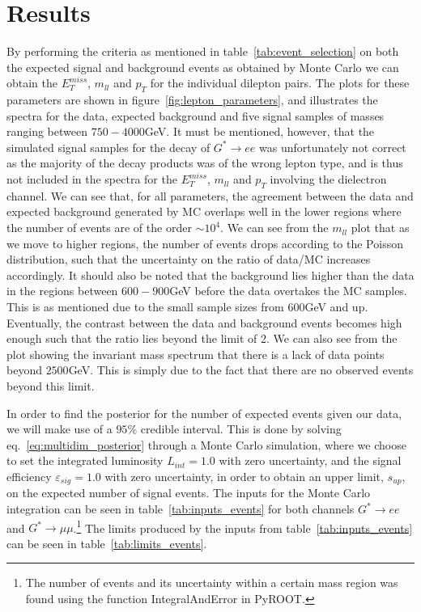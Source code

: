 \documentclass[12pt,a4paper]{amsart}
\begin{document}
\section{Results}
By performing the criteria as mentioned in table~\ref{tab:event_selection} on both the expected signal and background events as obtained by Monte Carlo we can obtain the $E_T^{miss}$, $m_{ll}$ and $p_T$ for the individual dilepton pairs. The plots for these parameters are shown in figure~\ref{fig:lepton_parameters}, and illustrates the spectra for the data, expected background and five signal samples of masses ranging between $750-4000$GeV. It must be mentioned, however, that the simulated signal samples for the decay of $G^*\rightarrow ee$ was unfortunately not correct as the majority of the decay products was of the wrong lepton type, and is thus not included in the spectra for the $E_T^{miss}$, $m_{ll}$ and $p_T$ involving the dielectron channel. We can see that, for all parameters, the agreement between the data and expected background generated by MC overlaps well in the lower regions where the number of events are of the order $\sim 10^4$. We can see from the $m_{ll}$ plot that as we move to higher regions, the number of events drops according to the Poisson distribution, such that the uncertainty on the ratio of data/MC increases accordingly. It should also be noted that the background lies higher than the data in the regions between $600-900$GeV before the data overtakes the MC samples. This is as mentioned due to the small sample sizes from $600$GeV and up.  Eventually, the contrast between the data and background events becomes high enough such that the ratio lies beyond the limit of 2. We can also see from the plot showing the invariant mass spectrum that there is a lack of data points beyond $2500$GeV. This is simply due to the fact that there are no observed events beyond this limit.

In order to find the posterior for the number of expected events given our data, we will make use of a $95\%$ credible interval. This is done by solving eq.~\eqref{eq:multidim_posterior} through a Monte Carlo simulation, where we choose to set the integrated luminosity $L_{int} = 1.0$ with zero uncertainty, and the signal efficiency $\varepsilon_{sig} = 1.0$ with zero uncertainty, in order to obtain an upper limit, $s_{up}$, on the expected number of signal events. The inputs for the Monte Carlo integration can be seen in table~\ref{tab:inputs_events} for both channels $G^{*}\rightarrow ee$ and $G^*\rightarrow \mu\mu$.\footnote{The number of events and its uncertainty within a certain mass region was found using the function IntegralAndError in PyROOT.} The limits produced by the inputs from table~\ref{tab:inputs_events} can be seen in table~\ref{tab:limits_events}.
\end{document}
